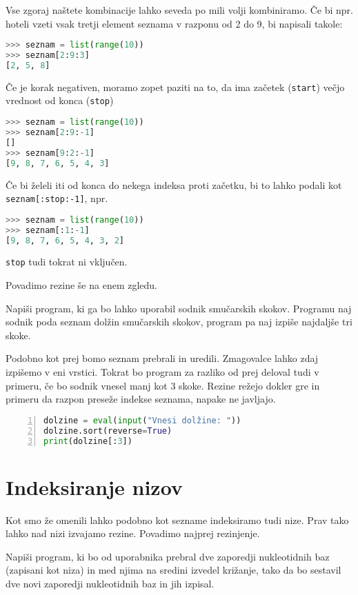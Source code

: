 Vse zgoraj naštete kombinacije lahko seveda po mili volji kombiniramo. Če bi npr. hoteli vzeti vsak tretji element seznama v razponu od 2 do 9, bi napisali takole:
\begin{lstlisting}[language=Python]
>>> seznam = list(range(10))
>>> seznam[2:9:3]
[2, 5, 8]
\end{lstlisting}
Če je korak negativen, moramo zopet paziti na to, da ima začetek (\texttt{start}) večjo vrednost od konca (\texttt{stop})
\begin{lstlisting}[language=Python]
>>> seznam = list(range(10))
>>> seznam[2:9:-1]
[]
>>> seznam[9:2:-1]
[9, 8, 7, 6, 5, 4, 3]
\end{lstlisting}
Če bi želeli iti od konca do nekega indeksa proti začetku, bi to lahko podali kot \texttt{seznam[:stop:-1]}, npr.
\begin{lstlisting}[language=Python]
>>> seznam = list(range(10))
>>> seznam[:1:-1]
[9, 8, 7, 6, 5, 4, 3, 2]
\end{lstlisting}
\texttt{stop} tudi tokrat ni vključen.

Povadimo rezine še na enem zgledu.
\begin{zgled}
Napiši program, ki ga bo lahko uporabil sodnik smučarskih skokov. Programu naj sodnik poda seznam dolžin smučarskih skokov, program pa naj izpiše najdaljše tri skoke.
\end{zgled}

\begin{resitev}
Podobno kot prej bomo seznam prebrali in uredili. Zmagovalce lahko zdaj izpišemo v eni vrstici. Tokrat bo program za razliko od prej deloval tudi v primeru, če bo sodnik vnesel manj kot 3 skoke. Rezine režejo dokler gre in primeru da razpon preseže indekse seznama, napake ne javljajo.
\begin{lstlisting}[language=Python,numbers=left]
dolzine = eval(input("Vnesi dolžine: "))
dolzine.sort(reverse=True)
print(dolzine[:3])
\end{lstlisting}
\end{resitev}

\section{Indeksiranje nizov}
Kot smo že omenili lahko podobno kot sezname indeksiramo tudi nize. Prav tako lahko nad nizi izvajamo rezine. Povadimo najprej rezinjenje.

\begin{zgled}
Napiši program, ki bo od uporabnika prebral dve zaporedji nukleotidnih baz (zapisani kot niza) in med njima na sredini izvedel križanje, tako da bo sestavil dve novi zaporedji nukleotidnih baz in jih izpisal.
\end{zgled}

